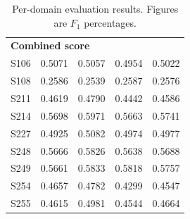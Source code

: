 \documentclass[11pt,letterpaper]{article}
\newcommand{\ensuretext}[1]{#1}
\newcommand{\nssmarker}{\ensuretext{\textcolor{magenta}{\ensuremath{^{\textsc{NS}}_{\textsc{S}}}}}}
\newcommand{\arkcomment}[3]{\ensuretext{\textcolor{#3}{[#1 #2]}}}
\newcommand{\nss}[1]{\arkcomment{\nssmarker}{#1}{magenta}}
\newcommand{\finalversion}[1]{}
\begin{document}
\begin{table}
\begin{tabular}{lrrrr}
\multicolumn{5}{l}{\textbf{Combined score}} \\

S106       &   0.5071 &  0.5057 &   0.4954 &      0.5022 \\
S108       &   0.2586 &  0.2539 &   0.2587 &      0.2576 \\
S211       &   0.4619 &  0.4790 &   0.4442 &      0.4586 \\
S214       &   0.5698 &  0.5971 &   0.5663 &      0.5741 \\
S227       &   0.4925 &  0.5082 &   0.4974 &      0.4977 \\
S248       &   0.5666 &  0.5826 &   0.5638 &      0.5688 \\
S249       &   0.5661 &  0.5833 &   0.5818 &      0.5757 \\
S254       &   0.4657 &  0.4782 &   0.4299 &      0.4547 \\
S255       &   0.4615 &  0.4981 &   0.4544 &      0.4664 \\

\bottomrule
\end{tabular}

\caption{Per-domain evaluation results. Figures are $F_1$ percentages.\finalversion{\nss{show condition, bold statistical winners?}}}	
\label{tbl:per-domain-results}
\end{table}



\setlength{\bibsep}{10pt}
{\fontsize{10}{12.25}\selectfont
}
\end{document}
